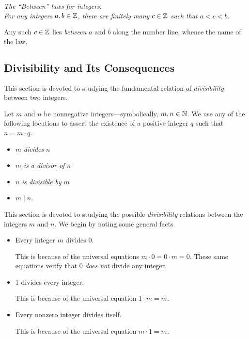 \medskip

\noindent
{\it The ``Between'' laws for integers}. \\
%
{\it For any integers $a, b \in \mathbb{Z}$, there are finitely many $c \in
  \mathbb{Z}$ such that $a < c < b$.}

\smallskip

Any such $c \in \mathbb{Z}$ lies {\em between} $a$ and $b$ along the number
line, whence the name of the law.


\subsection{Divisibility and Its Consequences}
\label{sec:divisibility}

This section is devoted to studying the fundamental relation of {\em
  divisibility} between two integers.

Let $m$ and $n$ be nonnegative integers---symbolically, $m, n \in \mathbb{N}$.
We use any of the following locutions to assert the existence of a
positive integer $q$ such that $n = m \cdot q$. 
\begin{itemize}
\item
$m$ {\it divides} $n$
\item
$m$ {\it is a divisor of} $n$
\item
$n$ {\it is divisible by} $m$
\item
$m \mid n$.
\end{itemize}
This section is devoted to studying the possible {\it divisibility}
relations between the integers $m$ and $n$.  We begin by noting some
general facts.
\begin{itemize}
\item
Every integer $m$ divides $0$.

This is because of the universal equations $m \cdot 0 = 0 \cdot m =
0$.  These same equations verify that $0$ {\em does not} divide any
integer.
\item
$1$ divides every integer.

This is because of the universal equation $1 \cdot m = m$.
\item
Every nonzero integer divides itself.

This is because of the universal equation $m \cdot 1 = m$.
\end{itemize}

